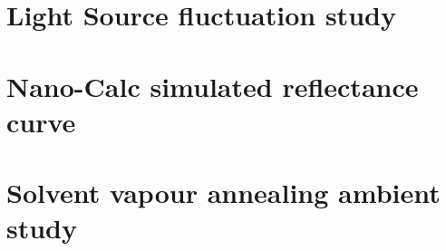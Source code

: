 \documentclass[MasterThesisMain.tex]{subfiles}
\begin{document}
\section{Light Source fluctuation study}\label{app:Lightstudy}


\section{Nano-Calc simulated reflectance curve}\label{app:simcurves}




\section{Solvent vapour annealing ambient study}\label{app:svaambient}


\end{document}
